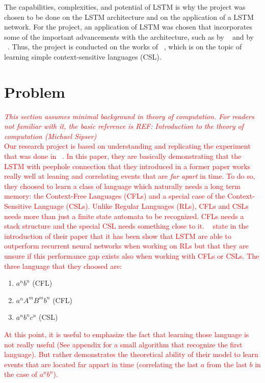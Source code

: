\documentclass[11pt,letterpaper]{article}
\begin{document}
The capabilities, complexities, and potential of LSTM is why the project was chosen to be done on the LSTM architecture and on the application of a LSTM network. For the project, an application of LSTM was chosen that incorporates some of the important advancements with the architecture, such as by ~\cite{Gers:99} and by ~\cite{Gers:02}. Thus, the project is conducted on the works of ~\cite{Gers:01}, which is on the topic of learning simple context-sensitive languages (CSL).  

\section{Problem}
\textcolor{red}{\textit{This section assumes minimal background in theory of computation. For readers not familiar with it, the basic reference is REF: Introduction to the theory of computation (Michael Sipser)}}\\

\textcolor{red}{Our research project is based on understanding and replicating the experiment that was done in ~\cite{Gers:01}.  In this paper, they are basically demonstrating that the LSTM with peephole connection that they introduced in a former paper works really well at leaning and correlating events that are \textit{far apart} in time. To do so, they choosed to learn a class of language which naturally needs a long term memory: the Context-Free Languages (CFLs) and a special case of the Context-Sensitive Language (CSLs). Unlike Regular Languages (RLs), CFLs and CSLs needs more than just a finite state automata to be recognized. CFLs needs a stack structure and the special CSL needs something close to it. ~\cite{Gers:01} state in the introduction of their paper that it has been show that LSTM are able to outperform recurrent neural networks when working on RLs but that they are unsure if this performance gap exists also when working with CFLs or CSLs. The three language that they choosed are: }

\begin{enumerate}
\color{red}
\item $a^nb^n$ (CFL)
\item $a^nA^mB^mb^n$ (CFL)
\item $a^nb^nc^n$ (CSL)
\end{enumerate}  

\textcolor{red}{At this point, it is useful to emphasize the fact that learning those language is not really useful (See appendix for a small algorithm that recognize the first language). But rather demonstrates the theoretical ability of their model to learn events that are located far appart in time (correlating the last $a$ from the last $b$ in the case of $a^nb^n$).}\\
\end{document}
